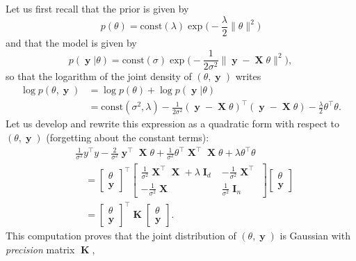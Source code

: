 \documentclass[
	fontsize=11pt, %
	twoside=false, %
	numbers=noenddot, %
]{kaobook}
\DeclareMathOperator{\bI}{{\boldsymbol I}}
\DeclareMathOperator{\bK}{{\boldsymbol K}}
\DeclareMathOperator{\bX}{{\boldsymbol X}}
\DeclareMathOperator{\by}{{\boldsymbol y}}
\newcommand{\norm}[1]{\| #1 \|}
\begin{document}
Let us first recall that the prior is given by
\begin{equation*}
	p(\theta) = \text{const}(\lambda) \exp \Big(- \frac{\lambda}{2} \norm{\theta}^2 \Big)
\end{equation*}
and that the model is given by
\begin{equation*}
	p(\by | \theta) = \text{const}(\sigma) \exp\Big( -\frac{1}{2 \sigma^2} \norm{\by - \bX \theta}^2 \Big),
\end{equation*}
so that the logarithm of the joint density of $(\theta, \by)$ writes
\begin{align*}
	\log p(\theta, \by) &= \log p(\theta) + \log p(\by | \theta) \\
	&= \text{const}(\sigma^2, \lambda) - \frac{1}{2 \sigma^2} (\by - \bX \theta)^\top (\by - \bX \theta) 
	- \frac{\lambda}{2} \theta^\top \theta.
\end{align*}
Let us develop and rewrite this expression as a quadratic form with respect to $(\theta, \by)$ (forgetting about the constant terms):
\begin{align*}
	&\frac{1}{\sigma^2} y^\top y - \frac{2}{\sigma^2} \by^\top \bX \theta + \frac{1}{\sigma^2} \theta^\top \bX^\top \bX \theta + \lambda \theta^\top \theta \\
	& \quad = 
	\begin{bmatrix}
	\theta \\
	\by
	\end{bmatrix}^\top
	\begin{bmatrix}
	\frac{1}{\sigma^2} \bX^\top \bX + \lambda \bI_d & - \frac{1}{\sigma^2} \bX^\top  \\
	- \frac{1}{\sigma^2} \bX & \frac{1}{\sigma^2} \bI_n
	\end{bmatrix}
	\begin{bmatrix}
	\theta \\
	\by
	\end{bmatrix} \\
	& \quad = \begin{bmatrix}
	\theta \\
	\by
	\end{bmatrix}^\top
	\bK
	\begin{bmatrix}
	\theta \\
	\by
	\end{bmatrix}.
\end{align*}
This computation proves that the joint distribution of $(\theta, \by)$ is Gaussian with \emph{precision} matrix $\bK$,%
\end{document}
